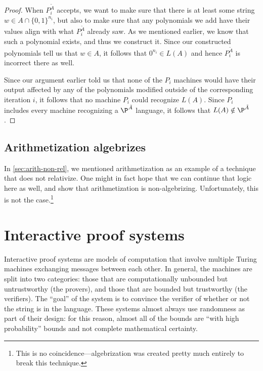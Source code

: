 \documentclass[english,12pt]{reedthesis}
\theoremstyle{plain}
\theoremstyle{definition}
\theoremstyle{remark}
\begin{document}
\begin{proof}
  When $P_{i}^{\tilde{A}}$ accepts, we want to make sure that there is at least
  some string $w \in A \cap \{0, 1\}^{n_{i}}$, but also to make sure that any
  polynomials we add have their values align with what $P_{i}^{\tilde{A}}$
  already saw. As we mentioned earlier, we know that such a polynomial exists,
  and thus we construct it. Since our constructed polynomials tell us that
  $w \in A$, it follows that $0^{n_{i}} \in L(A)$ and hence $P_{i}^{\tilde{A}}$ is
  incorrect there as well.

  Since our argument earlier told us that none of the $P_{i}$ machines would
  have their output affected by any of the polynomials modified outside of the
  corresponding iteration $i$, it follows that no machine $P_{i}$ could
  recognize $L(A)$. Since $P_{i}$ includes every machine recognizing a
  $\P^{\tilde{A}}$ language, it follows that $L(A) \notin \P^{\tilde{A}}$.
\end{proof}

\section{Arithmetization algebrizes}\label{sec:arith-algebrizes}

In \cref{sec:arith-non-rel}, we mentioned arithmetization as an example of a
technique that does not relativize. One might in fact hope that we can continue
that logic here as well, and show that arithmetization is non-algebrizing.
Unfortunately, this is not the case.\footnote{This is no
  coincidence---algebrization was created pretty much entirely to break this
  technique.}


\chapter{Interactive proof systems}\label{chap:ips}

Interactive proof systems are models of computation that involve multiple Turing
machines exchanging messages between each other. In general, the machines are
split into two categories: those that are computationally unbounded but
untrustworthy (the provers), and those that are bounded but trustworthy (the
verifiers). The ``goal'' of the system is to convince the verifier of whether or
not the string is in the language. These systems almost always use randomness as
part of their design: for this reason, almost all of the bounds are ``with high
probability'' bounds and not complete mathematical certainty.
\end{document}
